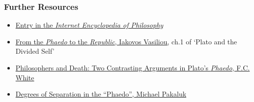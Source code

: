 \documentclass[]{article}
\begin{document}
\subsubsection{Further Resources}\label{further-resources}

\begin{itemize}
\itemsep1pt\parskip0pt
\item
  \href{http://www.iep.utm.edu/phaedo/}{Entry in the \emph{Internet
  Encyclopedia of Philosophy}}
\item
  \href{/Teaching/Ancient/Assignments/Divided.pdf}{From the
  \emph{Phaedo} to the \emph{Republic}, Iakovos Vasiliou,} ch.1 of
  `Plato and the Divided Self'
\item
  \href{/Teaching/Ancient/Assignments/Two.pdf}{Philosophers and Death:
  Two Contrasting Arguments in Plato's \emph{Phaedo}, F.C. White}
\item
  \href{/Teaching/Ancient/Assignments/Degrees.pdf}{Degrees of Separation
  in the ``Phaedo'', Michael Pakaluk}
\end{itemize}
\end{document}

